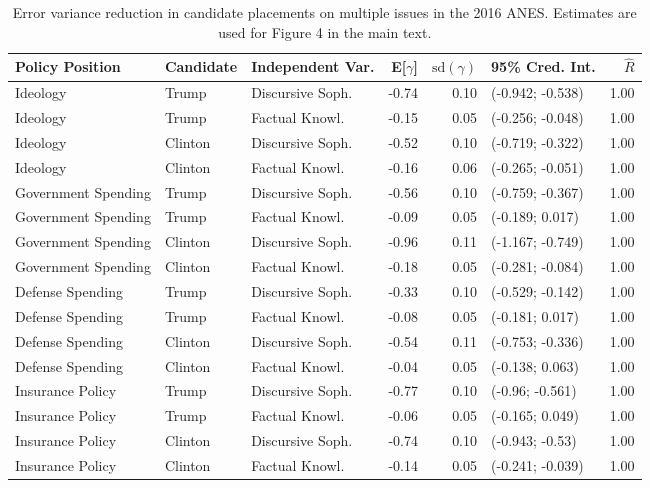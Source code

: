 \begin{table}[ht]
\centering
\caption{Error variance reduction in candidate placements on multiple issues in the 2016 ANES.
         Estimates are used for Figure 4 in the main text.} 
\label{app:hetreg2016}
\begin{tabular}{lllrrlr}
  \hline
Policy Position & Candidate & Independent Var. & E[$\gamma$] & $\text{sd}(\gamma)$ & 95\% Cred. Int. & $\hat{R}$ \\ 
  \hline
Ideology & Trump & Discursive Soph. & -0.74 & 0.10 & (-0.942; -0.538) & 1.00 \\ 
  Ideology & Trump & Factual Knowl. & -0.15 & 0.05 & (-0.256; -0.048) & 1.00 \\ 
  Ideology & Clinton & Discursive Soph. & -0.52 & 0.10 & (-0.719; -0.322) & 1.00 \\ 
  Ideology & Clinton & Factual Knowl. & -0.16 & 0.06 & (-0.265; -0.051) & 1.00 \\ 
  Government Spending & Trump & Discursive Soph. & -0.56 & 0.10 & (-0.759; -0.367) & 1.00 \\ 
  Government Spending & Trump & Factual Knowl. & -0.09 & 0.05 & (-0.189; 0.017) & 1.00 \\ 
  Government Spending & Clinton & Discursive Soph. & -0.96 & 0.11 & (-1.167; -0.749) & 1.00 \\ 
  Government Spending & Clinton & Factual Knowl. & -0.18 & 0.05 & (-0.281; -0.084) & 1.00 \\ 
  Defense Spending & Trump & Discursive Soph. & -0.33 & 0.10 & (-0.529; -0.142) & 1.00 \\ 
  Defense Spending & Trump & Factual Knowl. & -0.08 & 0.05 & (-0.181; 0.017) & 1.00 \\ 
  Defense Spending & Clinton & Discursive Soph. & -0.54 & 0.11 & (-0.753; -0.336) & 1.00 \\ 
  Defense Spending & Clinton & Factual Knowl. & -0.04 & 0.05 & (-0.138; 0.063) & 1.00 \\ 
  Insurance Policy & Trump & Discursive Soph. & -0.77 & 0.10 & (-0.96; -0.561) & 1.00 \\ 
  Insurance Policy & Trump & Factual Knowl. & -0.06 & 0.05 & (-0.165; 0.049) & 1.00 \\ 
  Insurance Policy & Clinton & Discursive Soph. & -0.74 & 0.10 & (-0.943; -0.53) & 1.00 \\ 
  Insurance Policy & Clinton & Factual Knowl. & -0.14 & 0.05 & (-0.241; -0.039) & 1.00 \\ 

\end{tabular}
\end{table}
